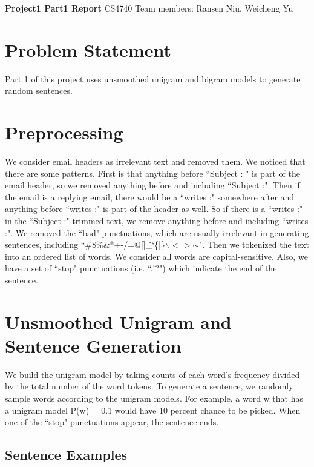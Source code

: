 \documentclass[a4paper, 11pt]{article}
\begin{document}
\noindent
\large\textbf{Project1 Part1 Report} \hfill 
\normalsize CS4740 \hfill Team members: Ransen Niu, Weicheng Yu \\

\section*{Problem Statement}
Part 1 of this project uses unsmoothed unigram and bigram models to generate random sentences.

\section*{Preprocessing}
We consider email headers as irrelevant text and removed them. We noticed that there are some patterns. First is that anything before ``Subject : " is part of the email header, so we removed anything before and including ``Subject :". Then if the email is a replying email, there would be a ``writes :" somewhere after and anything before ``writes :" is part of the header as well. So if there is a ``writes :" in the ``Subject :"-trimmed text, we remove anything before and including ``writes :". \newline
\newline
We removed the ``bad" punctuations, which are usually irrelevant in generating sentences, including ``\#\$\%\&\(\)*+-/=@[]\^\_`\{|\}$\backslash$$<$$>$$\sim$". Then we tokenized the text into an ordered list of words.\newline
\newline
We consider all words are capital-sensitive. Also, we have a set of  ``stop" punctuations (i.e. ``.!?") which indicate the end of the sentence.

\section*{Unsmoothed Unigram and Sentence Generation}
We build the unigram model by taking counts of each word's frequency divided by the total number of the word tokens. To generate a sentence, we randomly sample words according to the unigram models. For example, a word w that has a unigram model {P(w) = 0.1} would have 10 percent chance to be picked. When one of the ``stop" punctuations appear, the sentence ends.

\subsection*{Sentence Examples}
\end{document}
